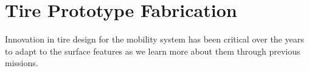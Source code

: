 \documentclass{article}
\begin{document}
\section{Tire Prototype Fabrication}
\label{sec:tire-prototyoe-fabrication}
Innovation in tire design for the mobility system has been critical over the years to adapt to the surface features as we learn more about them through previous missions. 

\begin{figure}[hbt!]
    \centering
    \begin{minipage}{0.35\textwidth}
        \centering
    \end{minipage}
    \begin{minipage}{0.28\textwidth}
        \centering

\end{minipage}
\end{figure}
\end{document}
